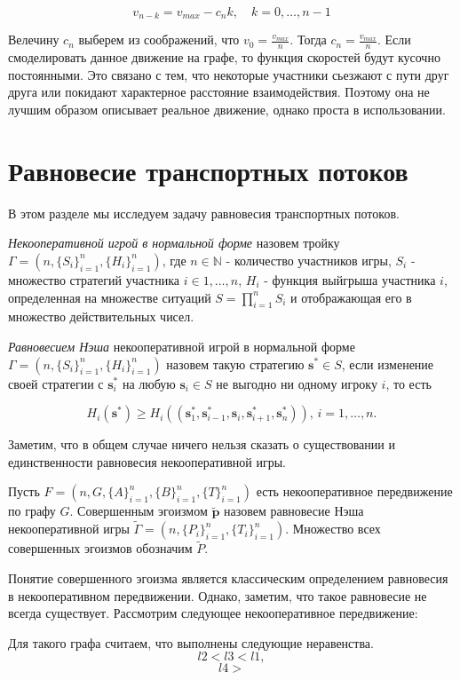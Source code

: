 \documentclass[12pt, a4paper]{article}
\begin{document}
$$v_{n - k} = v_{max} - c_n k, \quad k = 0, \dots, n - 1$$

Велечину $c_n$ выберем из соображений, что $v_0 = \frac{v_{max}}{n}$. Тогда $c_n = \frac{v_{max}}{n}$. Если смоделировать данное движение на графе, то функция скоростей будут кусочно постоянными. Это связано с тем, что некоторые участники сьезжают с пути друг друга или покидают характерное расстояние взаимодействия. Поэтому она не лучшим образом описывает реальное движение, однако проста в использовании.

\section{Равновесие транспортных потоков}
В этом разделе мы исследуем задачу равновесия транспортных потоков.

\textit{Некооперативной игрой в нормальной форме} назовем тройку $\Gamma = (n, \{S_i\}_{i = 1}^n, \{H_i\}_{i = 1}^n)$, где $n \in \mathbb{N}$ - количество участников игры, $S_i$ - множество стратегий участника $i \in {1, \dots, n}$, $H_i$ - функция выйгрыша участника $i$, определенная на множестве ситуаций $S = \prod\limits_{i = 1}^n S_i$ и отображающая его в множество действительных чисел.

\textit{Равновесием Нэша} некооперативной игрой в нормальной форме $\Gamma = (n, \{S_i\}_{i = 1}^n, \{H_i\}_{i = 1}^n)$ назовем такую стратегию $\textbf{s}^* \in S$, если изменение своей стратегии с $\textbf{s}_i^*$ на любую $\textbf{s}_i \in S$ не выгодно ни одному игроку $i$, то есть

$$H_i(\textbf{s}^*) \ge H_i(\left(\textbf{s}^*_1, \textbf{s}^*_{i - 1}, \textbf{s}_i, \textbf{s}^*_{i + 1}, \textbf{s}^*_{n} \right)), \, i = 1, \dots, n. $$ 

Заметим, что в общем случае ничего нельзя сказать о существовании и единственности равновесия некооперативной игры.

Пусть $F = (n, G, \{A\}_{i = 1}^{n}, \{B\}_{i = 1}^{n}, \{T\}_{i = 1}^{n})$ есть некооперативное передвижение по графу $G$. Совершенным эгоизмом $\widetilde{\textbf{p}}$ назовем равновесие Нэша некооперативной игры $\widetilde{\Gamma} = (n, \{P_i\}_{i = 1}^n, \{T_i\}_{i = 1}^n)$. Множество всех совершенных эгоизмов обозначим $\widetilde{P}$.

Понятие совершенного эгоизма является классическим определением равновесия в некооперативном передвижении. Однако, заметим, что такое равновесие не всегда существует. Рассмотрим следующее некооперативное передвижение:


Для такого графа считаем, что выполнены следующие неравенства.
$$l2 < l3 < l1,$$
$$l4 > $$
\end{document}
